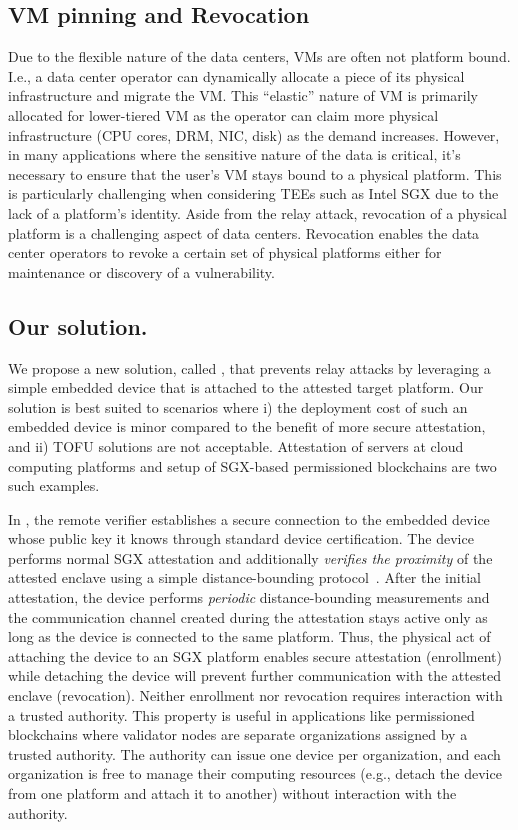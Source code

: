 \subsection{VM pinning and Revocation} Due to the flexible nature of the data centers, VMs are often not platform bound. I.e., a data center operator can dynamically allocate a piece of its physical infrastructure and migrate the VM. This ``elastic'' nature of VM is primarily allocated for lower-tiered VM as the operator can claim more physical infrastructure (CPU cores, DRM, NIC, disk) as the demand increases. However, in many applications where the sensitive nature of the data is critical, it's necessary to ensure that the user's VM stays bound to a physical platform. This is particularly challenging when considering TEEs such as Intel SGX due to the lack of a platform's identity. Aside from the relay attack, revocation of a physical platform is a challenging aspect of data centers. Revocation enables the data center operators to revoke a certain set of physical platforms either for maintenance or discovery of a vulnerability.

\subsection{Our solution.} We propose a new solution, called \name, that prevents relay attacks by leveraging a simple embedded device that is attached to the attested target platform. Our solution is best suited to scenarios where i) the deployment cost of such an embedded device is minor compared to the benefit of more secure attestation, and ii) TOFU solutions are not acceptable. Attestation of servers at cloud computing platforms and setup of SGX-based permissioned blockchains are two such examples. 

In \name, the remote verifier establishes a secure connection to the embedded device whose public key it knows through standard device certification. The device performs normal SGX attestation and additionally \emph{verifies the proximity} of the attested enclave using a simple distance-bounding protocol~\cite{distanceBounding}. After the initial attestation, the device performs \emph{periodic} distance-bounding measurements and the communication channel created during the attestation stays active only as long as the device is connected to the same platform. Thus, the physical act of attaching the device to an SGX platform enables secure attestation (enrollment) while detaching the device will prevent further communication with the attested enclave (revocation). Neither enrollment nor revocation requires interaction with a trusted authority. This property is useful in applications like permissioned blockchains where validator nodes are separate organizations assigned by a trusted authority. The authority can issue one device per organization, and each organization is free to manage their computing resources (e.g., detach the device from one platform and attach it to another) without interaction with the authority. 


